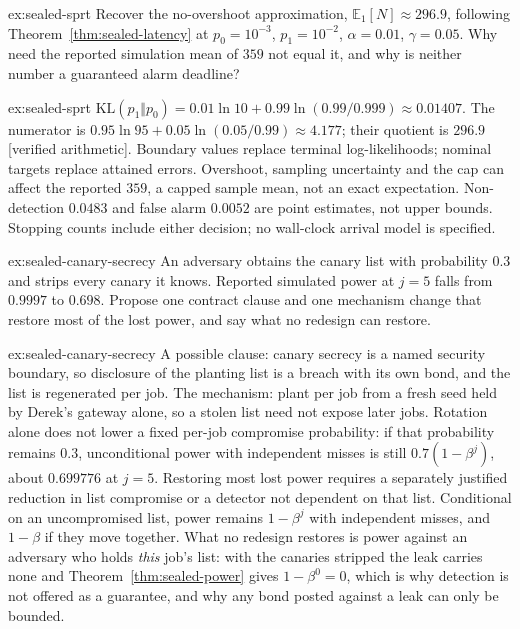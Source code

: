 \documentclass[11pt,a4paper]{article}
\theoremstyle{definition}
\begin{document}
\begin{pdexercise}[kind=Trace,rating=2]{ex:sealed-sprt}
Recover the no-overshoot approximation, $\mathbb{E}_1[N]\approx296.9$, following
Theorem~\ref{thm:sealed-latency} at $p_0=10^{-3}$, $p_1=10^{-2}$,
$\alpha=0.01$, $\gamma=0.05$. Why need the reported simulation mean of $359$
not equal it, and why is neither number a guaranteed alarm deadline?
\end{pdexercise}
\begin{pdsolution}{ex:sealed-sprt}
\relax
$\mathrm{KL}(p_1\Vert p_0)=0.01\ln10+0.99\ln(0.99/0.999)\approx0.01407$.
The numerator is $0.95\ln95+0.05\ln(0.05/0.99)\approx4.177$;
their quotient is $296.9$ [verified arithmetic]. Boundary values replace terminal
log-likelihoods; nominal targets replace attained errors. Overshoot, sampling
uncertainty and the cap can affect the reported $359$, a capped sample mean, not an
exact expectation. Non-detection
$0.0483$ and false alarm $0.0052$ are point estimates, not upper bounds.
Stopping counts include either decision; no wall-clock arrival model is specified.
\end{pdsolution}

\begin{pdexercise}[kind=Open,rating=3]{ex:sealed-canary-secrecy}
An adversary obtains the canary list with probability $0.3$ and strips every
canary it knows. Reported simulated power at $j=5$ falls from $0.9997$ to $0.698$.
Propose one contract clause and one mechanism change that restore most of the
lost power, and say what no redesign can restore.
\end{pdexercise}
\begin{pdsolution}{ex:sealed-canary-secrecy}
A possible clause: canary secrecy is a named security boundary, so disclosure of the
planting list is a breach with its own bond, and the list is regenerated per
job. The mechanism: plant per job from a fresh seed held by Derek's gateway
alone, so a stolen list need not expose later jobs. Rotation alone does not lower
a fixed per-job compromise probability: if that probability remains $0.3$,
unconditional power with independent misses is still $0.7(1-\beta^j)$,
about $0.699776$ at $j=5$.
Restoring most lost power requires a separately justified reduction in list
compromise or a detector not dependent on that list. Conditional on an
uncompromised list, power remains $1-\beta^j$ with independent misses, and
$1-\beta$ if they move together. What no redesign
restores is power against an adversary who holds \emph{this} job's list: with
the canaries stripped the leak carries none and Theorem~\ref{thm:sealed-power}
gives $1-\beta^0=0$, which is why detection is not offered as a guarantee,
and why any bond posted against a leak can only be bounded.
\end{pdsolution}
\end{document}
